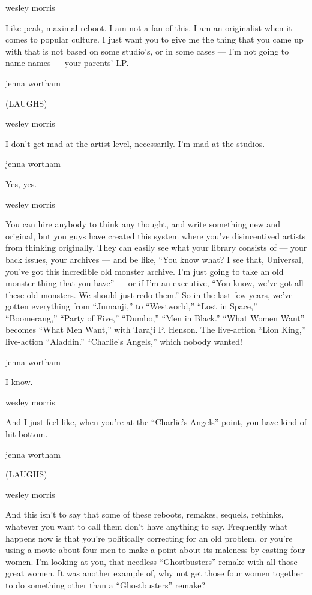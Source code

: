 wesley morris

Like peak, maximal reboot. I am not a fan of this. I am an originalist
when it comes to popular culture. I just want you to give me the thing
that you came up with that is not based on some studio's, or in some
cases --- I'm not going to name names --- your parents' I.P.

jenna wortham

(LAUGHS)

wesley morris

I don't get mad at the artist level, necessarily. I'm mad at the
studios.

jenna wortham

Yes, yes.

wesley morris

You can hire anybody to think any thought, and write something new and
original, but you guys have created this system where you've
disincentived artists from thinking originally. They can easily see what
your library consists of --- your back issues, your archives --- and be
like, ``You know what? I see that, Universal, you've got this incredible
old monster archive. I'm just going to take an old monster thing that
you have'' --- or if I'm an executive, ``You know, we've got all these
old monsters. We should just redo them.'' So in the last few years,
we've gotten everything from ``Jumanji,'' to ``Westworld,'' ``Lost in
Space,'' ``Boomerang,'' ``Party of Five,'' ``Dumbo,'' ``Men in Black.''
``What Women Want'' becomes ``What Men Want,'' with Taraji P. Henson.
The live-action ``Lion King,'' live-action ``Aladdin.'' ``Charlie's
Angels,'' which nobody wanted!

jenna wortham

I know.

wesley morris

And I just feel like, when you're at the ``Charlie's Angels'' point, you
have kind of hit bottom.

jenna wortham

(LAUGHS)

wesley morris

And this isn't to say that some of these reboots, remakes, sequels,
rethinks, whatever you want to call them don't have anything to say.
Frequently what happens now is that you're politically correcting for an
old problem, or you're using a movie about four men to make a point
about its maleness by casting four women. I'm looking at you, that
needless ``Ghostbusters'' remake with all those great women. It was
another example of, why not get those four women together to do
something other than a ``Ghostbusters'' remake?

